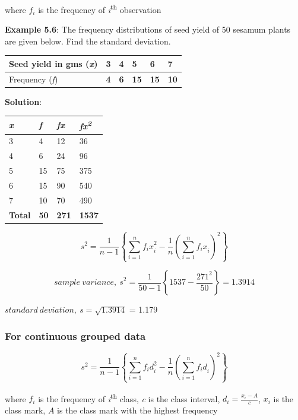 \documentclass[
]{book}
\begin{document}
where \(f_{i}\) is the frequency of \emph{i}\textsuperscript{th} observation

\textbf{Example 5.6}: The frequency distributions of seed yield of 50 sesamum
plants are given below. Find the standard deviation.

\begin{longtable}[]{@{}llllll@{}}
\toprule
Seed yield in gms (\emph{x}) & \textbf{3} & \textbf{4} & \textbf{5} & \textbf{6} & \textbf{7} \\
\midrule
\endhead
Frequency (\emph{f}) & \textbf{4} & \textbf{6} & \textbf{15} & \textbf{15} & \textbf{10} \\
\bottomrule
\end{longtable}

\textbf{Solution}:

\begin{longtable}[]{@{}llll@{}}
\toprule
\textbf{\emph{x}} & \textbf{\emph{f}} & \textbf{\emph{fx}} & \textbf{\emph{fx\textsuperscript{2}}} \\
\midrule
\endhead
3 & 4 & 12 & 36 \\
4 & 6 & 24 & 96 \\
5 & 15 & 75 & 375 \\
6 & 15 & 90 & 540 \\
7 & 10 & 70 & 490 \\
\textbf{Total} & \textbf{50} & \textbf{271} & \textbf{1537} \\
\bottomrule
\end{longtable}

\[s^{2} = \frac{1}{n - 1}\left\{ \sum_{i = 1}^{n}{{f_{i}x}_{i}^{2} - \frac{1}{n}}\left( \sum_{i = 1}^{n}{f_{i}x}_{i} \right)^{2} \right\}\]

\[{sample\ variance,\ s}^{2} = \frac{1}{50 - 1}\left\{ 1537 - \frac{271^{2}}{50} \right\} = 1.3914\]

\(standard\ deviation,\ s = \sqrt{1.3914}\) = 1.179

\hypertarget{for-continuous-grouped-data}{%
\subsubsection{For continuous grouped data}\label{for-continuous-grouped-data}}

\[s^{2} = \frac{1}{n - 1}\left\{ \sum_{i = 1}^{n}{{f_{i}d}_{i}^{2} - \frac{1}{n}}\left( \sum_{i = 1}^{n}{f_{i}d}_{i} \right)^{2} \right\}\]

where \(f_{i}\) is the frequency of \emph{i}\textsuperscript{th} class, \emph{c} is the class
interval, \(d_{i} = \frac{x_{i} - A}{c}\), \(x_{i}\) is the class mark, \(A\)
is the class mark with the highest frequency
\end{document}
